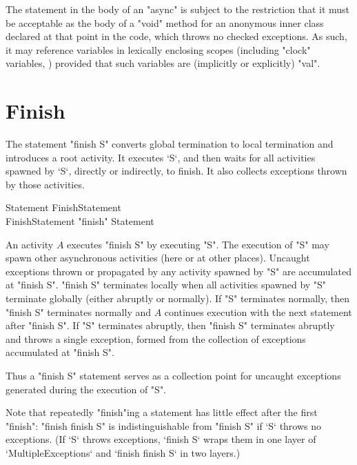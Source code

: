 \begin{staticrule*}
The statement in the body of an \xcd"async" is subject to the
restriction that it must be acceptable as the body of a \xcd"void"
method for an anonymous inner class declared at that point in the code,
which throws no checked exceptions. As such, it may reference
variables in lexically enclosing scopes (including \xcd"clock"
variables, ) provided that such variables are
(implicitly or explicitly) \xcd"val".
\end{staticrule*}

\section{Finish}\label{finish}
The statement \xcd"finish S" converts global termination to local
termination and introduces a root activity.   It executes \xcd`S`, and then
waits for all activities spawned by \xcd`S`, directly or indirectly, to
finish. It also collects exceptions thrown by those activities.

\begin{grammar}
Statement \: FinishStatement \\
FinishStatement \: \xcd"finish" Statement 
\end{grammar}

An activity $A$ executes \xcd"finish S" by executing \xcd"S".  The
execution of \xcd"S" may spawn other asynchronous activities (here or
at other places).  Uncaught exceptions thrown or propagated by any
activity spawned by \xcd"S" are accumulated at \xcd"finish S".
\xcd"finish S" terminates locally when all activities spawned by
\xcd"S" terminate globally (either abruptly or normally). If \xcd"S"
terminates normally, then \xcd"finish S" terminates normally and $A$
continues execution with the next statement after \xcd"finish S".  If
\xcd"S" terminates abruptly, then \xcd"finish S" terminates abruptly
and throws a single exception, 
formed from the collection of exceptions accumulated at \xcd"finish S".

Thus a \xcd"finish S" statement serves as a collection point for
uncaught exceptions generated during the execution of \xcd"S".

Note that repeatedly \xcd"finish"ing a statement has little effect after
the first \xcd"finish": \xcd"finish finish S" is indistinguishable
from \xcd"finish S" if \xcd`S` throws no exceptions.  (If \xcd`S` throws
exceptions, \xcd`finish S` wraps them in one layer of 
\xcd`MultipleExceptions` and \xcd`finish finish S` in two layers.)

